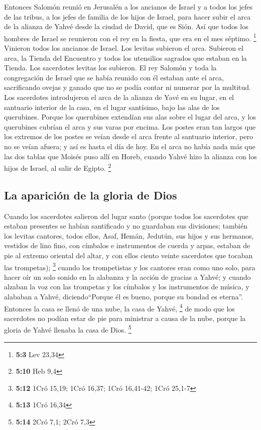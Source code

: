 \begin{paracol}{2}
 Entonces Salomón reunió en Jerusalén a los ancianos de
Israel y a todos los jefes de las tribus, a los jefes de familia de los
hijos de Israel, para hacer subir el arca de la alianza de Yahvé desde
la ciudad de David, que es Sión.  Así que todos los
hombres de Israel se reunieron con el rey en la fiesta, que era en el
mes séptimo. \footnote{\textbf{5:3} Lev 23,34}  Vinieron
todos los ancianos de Israel. Los levitas subieron el arca.
 Subieron el arca, la Tienda del Encuentro y todos los
utensilios sagrados que estaban en la Tienda. Los sacerdotes levitas los
subieron.  El rey Salomón y toda la congregación de Israel
que se había reunido con él estaban ante el arca, sacrificando ovejas y
ganado que no se podía contar ni numerar por la multitud. 
Los sacerdotes introdujeron el arca de la alianza de Yavé en su lugar,
en el santuario interior de la casa, en el lugar santísimo, bajo las
alas de los querubines.  Porque los querubines extendían
sus alas sobre el lugar del arca, y los querubines cubrían el arca y sus
varas por encima.  Los postes eran tan largos que los
extremos de los postes se veían desde el arca frente al santuario
interior, pero no se veían afuera; y así es hasta el día de hoy.
 En el arca no había nada más que las dos tablas que
Moisés puso allí en Horeb, cuando Yahvé hizo la alianza con los hijos de
Israel, al salir de Egipto. \footnote{\textbf{5:10} Heb 9,4}

\hypertarget{la-apariciuxf3n-de-la-gloria-de-dios}{%
\subsection{La aparición de la gloria de
Dios}\label{la-apariciuxf3n-de-la-gloria-de-dios}}

 Cuando los sacerdotes salieron del lugar santo (porque
todos los sacerdotes que estaban presentes se habían santificado y no
guardaban sus divisiones;  también los levitas cantores,
todos ellos, Asaf, Hemán, Jedutún, sus hijos y sus hermanos, vestidos de
lino fino, con címbalos e instrumentos de cuerda y arpas, estaban de pie
al extremo oriental del altar, y con ellos ciento veinte sacerdotes que
tocaban las trompetas); \footnote{\textbf{5:12} 1Cró 15,19; 1Cró 16,37;
  1Cró 16,41-42; 1Cró 25,1-7}  cuando los trompetistas y
los cantores eran como uno solo, para hacer oír un solo sonido en la
alabanza y la acción de gracias a Yahvé; y cuando alzaban la voz con las
trompetas y los címbalos y los instrumentos de música, y alababan a
Yahvé, diciendo``Porque él es bueno, porque su bondad es eterna''.
Entonces la casa se llenó de una nube, la casa de Yahvé, \footnote{\textbf{5:13}
  1Cró 16,34}  de modo que los sacerdotes no podían estar
de pie para ministrar a causa de la nube, porque la gloria de Yahvé
llenaba la casa de Dios. \footnote{\textbf{5:14} 2Cró 7,1; 2Cró 7,3}


\end{paracol}
